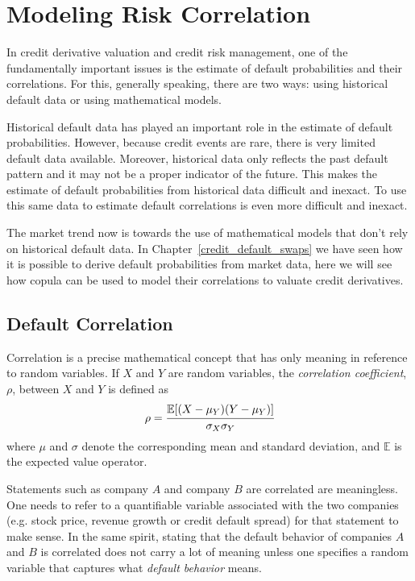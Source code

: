 \chapter{Modeling Risk Correlation}

In credit derivative valuation and credit risk management, one of the fundamentally important issues is the estimate of default probabilities and their correlations. For this, generally speaking, there are two ways: using historical default data or using mathematical models.

Historical default data has played an important role in the estimate of default probabilities. However, because credit events are rare, there is very limited default data available. Moreover, historical data only reflects the past default pattern and it may not be a proper indicator of the future. This makes the estimate of default probabilities from historical data difficult and inexact. To use this same data to estimate default correlations is even more difficult and inexact.

The market trend now is towards the use of mathematical models that don't rely on historical default data. In Chapter~\ref{credit_default_swaps} we have seen how it is possible to derive default probabilities from market data, here we will see how copula can be used to model their correlations to valuate credit derivatives. 

\section{Default Correlation}\label{sec:default_correlation}
Correlation is a precise mathematical concept that has only meaning in reference to random variables. If $X$ and $Y$ are random variables, the \emph{correlation coefficient}, $\rho$, between $X$ and $Y$ is defined as
\begin{equation}
\rho = \cfrac{\mathbb{E}[(X-\mu_Y)(Y-\mu_Y)]}{\sigma_X \sigma_Y}
\label{eq:correlation_coefficient}
\end{equation}
where $\mu$ and $\sigma$ denote the corresponding mean and standard deviation, and $\mathbb{E}$ is the expected value operator.

Statements such as company $A$ and company $B$ are correlated are meaningless. One needs to refer to a quantifiable variable associated with the two companies (e.g. stock price, revenue growth or credit default spread) for that statement to make sense.
In the same spirit, stating that the default behavior of companies $A$ and $B$ is correlated does not carry a lot of meaning unless one specifies a random variable that captures what \emph{default behavior} means. %

